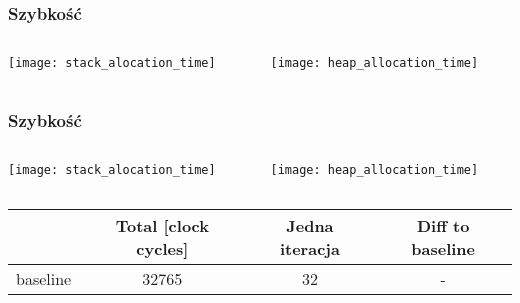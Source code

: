 \documentclass{beamer}
\begin{document}
\begin{frame}[t]
    \frametitle{Szybkość}
    \begin{columns}[t]
        \begin{column}[t]{0.5\textwidth}
            \begin{center}
                \texttt{[image: stack\_alocation\_time]}
            \end{center}
        \end{column}
        \begin{column}[t]{0.5\textwidth}
            \begin{center}
                \texttt{[image: heap\_allocation\_time]}
            \end{center}
        \end{column}
    \end{columns}
\end{frame}
\begin{frame}[t]
    \frametitle{Szybkość}
    \begin{columns}[t]
        \begin{column}[t]{0.5\textwidth}
            \begin{center}
                \texttt{[image: stack\_alocation\_time]}
            \end{center}
        \end{column}
        \begin{column}[t]{0.5\textwidth}
            \begin{center}
                \texttt{[image: heap\_allocation\_time]}
            \end{center}
        \end{column}
    \end{columns}
    \begin{center}
        \begin{tabular}{|| r | c | c | c ||}
        \hline
         & Total [clock cycles] & Jedna iteracja & Diff to baseline \\ [0.2ex] 
        \hline
        \hline
        baseline & 32765 & 32 & - \\
        \hline
        \end{tabular}
    \end{center}
\end{frame}
\end{document}

